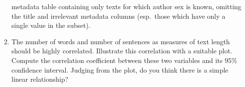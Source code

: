 \documentclass[a4paper,12pt]{article}
\begin{document}
\begin{enumerate}
  metadata table containing only texts for which author sex is known, omitting
  the title and irrelevant metadata columns (esp.\ those which have only a
  single value in the subset).
\item The number of words and number of sentences as measures of text length
  should be highly correlated.  Illustrate this correlation with a suitable
  plot.  Compute the correlation coefficient between these two variables and
  its 95\% confidence interval.
  Judging from the plot, do you think there is a simple linear relationship?

\end{enumerate}
\end{document}
